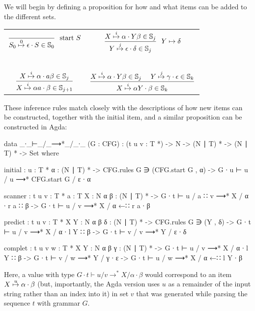 		We will begin by defining a proposition for how and what items can be
		added to the different sets.

		\begin{table}[h]
			\centering
			\begin{tabular}{cc}
				\( \displaystyle \frac{}
					{\earley{S_0}{\epsilon}{S}{0} \in \mathbb{S}_0}
					~~\textrm{start } S
					\) &
				\( \displaystyle \frac
					{\earley{X}{\alpha}{Y\beta}{i} \in \mathbb{S}_j}
					{\earley{Y}{\epsilon}{\delta}{j} \in \mathbb{S}_j}
					~~Y \mapsto \delta
					\) 
				\\~&~\\
				\( \displaystyle \frac
					{\earley{X}{\alpha}{a\beta}{i} \in \mathbb{S}_j}
					{\earley{X}{\alpha a}{\beta}{i} \in \mathbb{S}_{j+1}} 
					\) &
				\( \displaystyle \frac
					{
						\earley{X}{\alpha}{Y\beta}{i} \in \mathbb{S}_j~~~~
						\earley{Y}{\gamma}{\epsilon}{j} \in \mathbb{S}_k
						}
					{\earley{X}{\alpha Y}{\beta}{i} \in \mathbb{S}_k} 
					\)
			\end{tabular}
		\end{table}

		These inference rules match closely with the descriptions of how new
		items can be constructed, together with the initial item, and a similar
		proposition can be constructed in Agda:

		\begin{code}
			data _∙_⊢_/_⟶*_/_∙_ (G : CFG) :
			  (t u v : T *) -> N -> (N ∣ T) * -> (N ∣ T) * -> Set where

			  initial : {u : T *} {α : (N ∣ T) *} ->
			    CFG.rules G ∋ (CFG.start G , α) ->
			    G ∙ u ⊢ u / u ⟶* CFG.start G / ε ∙ α

			  scanner : {t u v : T *} {a : T} {X : N} {α β : (N ∣ T) *} ->
			    G ∙ t ⊢ u / a ∷ v ⟶* X / α ∙ r a ∷ β ->
			      G ∙ t ⊢ u / v ⟶* X / α ←∷ r a ∙ β

			  predict : {t u v : T *} {X Y : N} {α β δ : (N ∣ T) *} ->
			    CFG.rules G ∋ (Y , δ) ->
			    G ∙ t ⊢ u / v ⟶* X / α ∙ l Y ∷ β ->
			      G ∙ t ⊢ v / v ⟶* Y / ε ∙ δ

			  complet : {t u v w : T *} {X Y : N} {α β γ : (N ∣ T) *} ->
			    G ∙ t ⊢ u / v ⟶* X / α ∙ l Y ∷ β ->
			    G ∙ t ⊢ v / w ⟶* Y / γ ∙ ε ->
			      G ∙ t ⊢ u / w ⟶* X / α ←∷ l Y ∙ β
		\end{code}

		Here, a value with type $G \cdot t \vdash u / v \rightarrow^* X /
		\alpha \cdot \beta$ would correspond to an item
		$\earley{X}{\alpha}{\beta}{u}$ (but, importantly, the Agda version uses
		$u$ as a remainder of the input string rather than an index into it) in
		set $v$ that was generated while parsing the sequence $t$ with grammar
		$G$.

